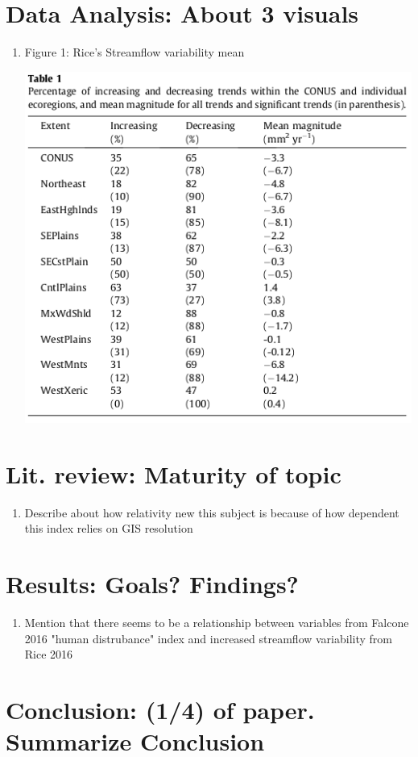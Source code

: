 \documentclass{article}
\begin{document}
\section{Data Analysis: About 3 visuals}

    \begin{enumerate}
        \item Figure 1: Rice's Streamflow variability mean
            \begin{center}
            \includegraphics[width=.5\textwidth]{rice_streamflow_mean}
            \end{center}
    \end{enumerate}

\section{Lit. review: Maturity of topic}

    \begin{enumerate}
        \item Describe about how relativity new this subject is because of how dependent this index relies on GIS resolution
    \end{enumerate}

\section{Results: Goals? Findings?}

    \begin{enumerate}
        \item Mention that there seems to be a relationship between variables from Falcone 2016 "human distrubance" index and increased streamflow variability from Rice 2016
    \end{enumerate}

\section{Conclusion: (1/4) of paper. Summarize Conclusion}
\end{document}
